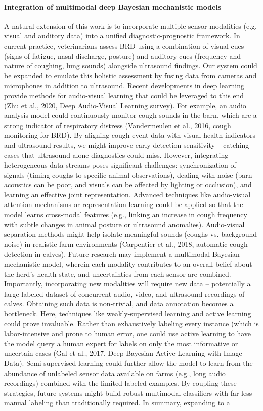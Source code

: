 \paragraph{Integration of multimodal deep Bayesian mechanistic models} A natural extension of this work is to incorporate multiple sensor modalities (e.g. visual and auditory data) into a unified diagnostic-prognostic framework. In current practice, veterinarians assess BRD using a combination of visual cues (signs of fatigue, nasal discharge, posture) and auditory cues (frequency and nature of coughing, lung sounds) alongside ultrasound findings. Our system could be expanded to emulate this holistic assessment by fusing data from cameras and microphones in addition to ultrasound. Recent developments in deep learning provide methods for audio-visual learning that could be leveraged to this end (Zhu et al., 2020, Deep Audio-Visual Learning survey). For example, an audio analysis model could continuously monitor cough sounds in the barn, which are a strong indicator of respiratory distress (Vandermeulen et al., 2016, cough monitoring for BRD). By aligning cough event data with visual health indicators and ultrasound results, we might improve early detection sensitivity – catching cases that ultrasound-alone diagnostics could miss. However, integrating heterogeneous data streams poses significant challenges: synchronization of signals (timing coughs to specific animal observations), dealing with noise (barn acoustics can be poor, and visuals can be affected by lighting or occlusion), and learning an effective joint representation. Advanced techniques like audio-visual attention mechanisms or representation learning could be applied so that the model learns cross-modal features (e.g., linking an increase in cough frequency with subtle changes in animal posture or ultrasound anomalies). Audio-visual separation methods might help isolate meaningful sounds (coughs vs. background noise) in realistic farm environments (Carpentier et al., 2018, automatic cough detection in calves). Future research may implement a multimodal Bayesian mechanistic model, wherein each modality contributes to an overall belief about the herd’s health state, and uncertainties from each sensor are combined. Importantly, incorporating new modalities will require new data – potentially a large labeled dataset of concurrent audio, video, and ultrasound recordings of calves. Obtaining such data is non-trivial, and data annotation becomes a bottleneck. Here, techniques like weakly-supervised learning and active learning could prove invaluable. Rather than exhaustively labeling every instance (which is labor-intensive and prone to human error, one could use active learning to have the model query a human expert for labels on only the most informative or uncertain cases (Gal et al., 2017, Deep Bayesian Active Learning with Image Data). Semi-supervised learning could further allow the model to learn from the abundance of unlabeled sensor data available on farms (e.g., long audio recordings) combined with the limited labeled examples. By coupling these strategies, future systems might build robust multimodal classifiers with far less manual labeling than traditionally required. In summary, expanding to a 